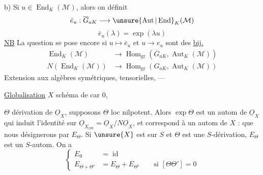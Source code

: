 b) Si $u\in\operatorname{End}_K(\mathcal M)$, alors on définit
\[
\bar e_u:\overline G_{aK}\longrightarrow\unsure{\operatorname{Aut}|\operatorname{End}}_K(\mathcal M)
\]
\[
\bar e_u(\lambda)=\exp(\lambda u)
\]
\uline{NB} La question se pose encore si $u\longmapsto\bar e_u$ et $u\longrightarrow e_u$ sont des \uline{bij.}
\[
\begin{aligned}
\operatorname{End}_K(\mathcal M)&\longrightarrow\operatorname{Hom}_{\mathrm{gr}}(\overline G_{aK},\operatorname{Aut}_K(\mathcal M))\\
N(\operatorname{End}_K(\mathcal M))&\longrightarrow\operatorname{Hom}_{\mathrm{gr}}(G_{aK},\operatorname{Aut}_K(\mathcal M))
\end{aligned}
\]
Extension aux  algèbres symétriques, tensorielles,  ---


\uline{Globalisation}  $X$ schéma de car 0,

$\Theta$  dérivation de $\underline O_X$, supposons $\Theta$ loc nilpotent. Alors $\exp\Theta$ est un autom de $\underline O_X$ qui induit l'identité sur $\underline O_{X_{\mathrm{réd}}}=\underline O_X/N\underline O_X$, et correspond à un autom de $X$ : que nous désignerons par $E_\Theta$. Si $\unsure{X}$ est sur $S$ et $\Theta$ est une $S$-dérivation, $E_\Theta$ est un $S$-autom. On a
\[
\left\{\begin{aligned}
E_0&=\operatorname{id}\\
E_{\Theta+\Theta'}&=E_\Theta+E_{\Theta'}\qquad\text{si }[\Theta\Theta']=0
\end{aligned}\right.
\]
